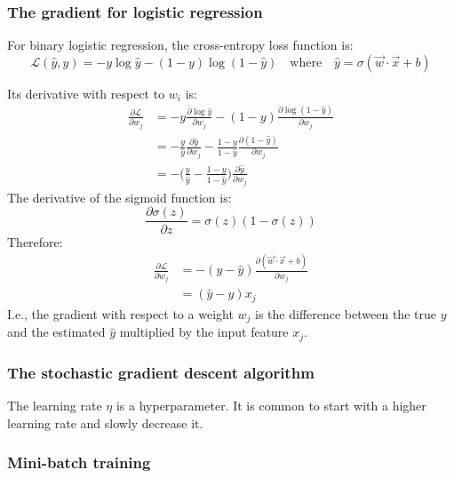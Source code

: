 \subsubsection{The gradient for logistic regression}

For binary logistic regression, the cross-entropy loss function is:
\begin{equation}
  \label{eqnBinaryCrossEntropy}
  \mathcal{L}(\hat{y}, y) = - y \log \hat{y} - (1 - y) \log (1 - \hat{y})
  \quad \text{where} \quad
  \hat{y} = \sigma(\vec{w} \cdot \vec{x} + b)
\end{equation}

Its derivative with respect to $w_i$ is:
\begin{align}
  \frac{\partial \mathcal{L}}{\partial w_j}
   & = - y \frac{\partial \log \hat{y}}{\partial w_j} - (1 - y) \frac{\partial \log (1 - \hat{y})}{\partial w_j}                         \\
   & = - \frac{y}{\hat{y}} \frac{\partial \hat{y}}{\partial w_j} - \frac{1 - y}{1 - \hat{y}} \frac{\partial (1 - \hat{y})}{\partial w_j} \\
   & = - \biggl( \frac{y}{\hat{y}} - \frac{1 - y}{1 - \hat{y}} \biggr) \frac{\partial \hat{y}}{\partial w_j}
\end{align}
The derivative of the sigmoid function is:
\begin{equation}
  \label{eqnSigmoidDerivative}
  \frac{\partial \sigma(z)}{\partial z} = \sigma(z) (1 - \sigma(z))
\end{equation}
Therefore:
\begin{align}
  \frac{\partial \mathcal{L}}{\partial w_j}
   & =  - (y - \hat{y}) \frac{\partial (\vec{w} \cdot \vec{x} + b)}{\partial w_j} \\
   & = (\hat{y} - y) x_j
\end{align}
I.e., the gradient with respect to a weight $w_j$ is the difference between the true $y$ and the estimated $\hat{y}$ multiplied by the input feature $x_j$.

\subsubsection{The stochastic gradient descent algorithm}

The learning rate $\eta$ is a hyperparameter.
It is common to start with a higher learning rate and slowly decrease it.

\setcounter{subsubsection}{3}
\subsubsection{Mini-batch training}